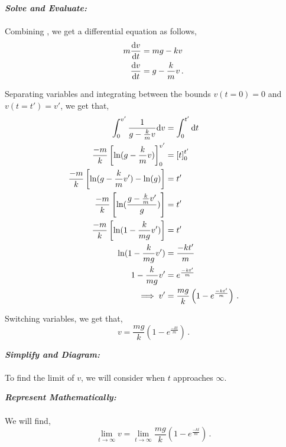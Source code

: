 \begin{subquestions}
\begin{subsubquestions}
\textbf{\textit{Solve and Evaluate:}} \\ \\
Combining , we get a differential equation as follows,
\begin{align}
	m\frac{\mathrm{d}v}{\mathrm{d}t} & = mg - kv \nonumber \\
	\frac{\mathrm{d}v}{\mathrm{d}t} & = g -\frac{k}{m}v \,.
\end{align}

Separating variables and integrating between the bounds $v(t=0)=0$ and $v(t=t')=v'$, we get that,
\begin{align}
	\int_{0}^{v'}\frac{1}{g-\frac{k}{m}v} \mathrm{d} v & = \int_{0}^{t'} \mathrm{d} t \nonumber \\
	\frac{-m}{k}\left[\ln(g-\frac{k}{m}v)\right]_{0}^{v'} & = \left[t\right]_0^{t'} \nonumber \\
	\frac{-m}{k}\left[\ln(g-\frac{k}{m}v')-\ln(g)\right] & = t' \nonumber \\
	\frac{-m}{k}\left[\ln(\frac{g-\frac{k}{m}v'}{g})\right] & = t' \nonumber \\
	\frac{-m}{k}\left[\ln(1-\frac{k}{mg}v')\right] & = t' \nonumber \\
	\ln(1-\frac{k}{mg}v') & = \frac{-kt'}{m} \nonumber \\
	1-\frac{k}{mg}v' & = e^{\frac{-kt'}{m}} \nonumber \\
	\implies v' & = \frac{mg}{k}\left(1-e^{\frac{-kt'}{m}}\right) \,.
\end{align}

Switching variables, we get that, 
\begin{equation}
	v = \frac{mg}{k}\left(1-e^{\frac{-kt}{m}}\right) \,.
\end{equation}


\subsubquestion

\textbf{\textit{Simplify and Diagram:}} \\ \\
To find the limit of $v$, we will consider when $t$ approaches $\infty$.




\textbf{\textit{Represent Mathematically:}} \\ \\
We will find,
\begin{equation}
	\lim_{t\rightarrow \infty} v = \lim_{t\rightarrow \infty}      \frac{mg}{k}\left(1-e^{\frac{-kt}{m}}\right) \label{2005:q5:TLim} \,.
\end{equation}





\end{subsubquestions}
\end{subquestions}
